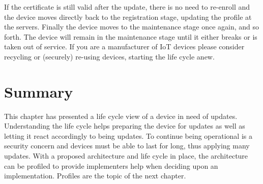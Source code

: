 \documentclass[0-thesis.tex]{subfiles}
\begin{document}
If the certificate is still valid after the update, there is no need to re-enroll and the
device moves directly back to the registration stage, updating the profile at the servers.
Finally the device moves to the maintenance stage once again, and so forth. The device
will remain in the maintenance stage until it either breaks or is taken out of service. If
you are a manufacturer of IoT devices please consider recycling or (securely) re-using
devices, starting the life cycle anew.

\section{Summary}
\label{sec:4-summary}
This chapter has presented a life cycle view of a device in need of updates. Understanding
the life cycle helps preparing the device for updates as well as letting it react
accordingly to being updates. To continue being operational is a security concern and
devices must be able to last for long, thus applying many updates. With a proposed
architecture and life cycle in place, the architecture can be profiled to provide
implementers help when deciding upon an implementation. Profiles are the topic of the next
chapter.
\end{document}
